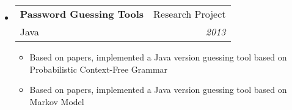 \documentclass[letterpaper,10pt]{article}
\makeatletter
\newcommand{\resitem}[1]{\item #1 \vspace{-2pt}}
\newcommand{\resheading}[1]{{\large \colorbox{mygrey}{\begin{minipage}{\textwidth}{\textbf{#1 \vphantom{p\^{E}}}}\end{minipage}}}}
\newcommand{\ressubheading}[4]{
\begin{tabular*}{6.5in}{l@{\extracolsep{\fill}}r}
		\textbf{#1} & #2 \\
		#3 & #4 \\
\end{tabular*}\vspace{-6pt}}
\makeatother
\begin{document}
	\begin{itemize}
		\item
			\ressubheading{Password Guessing Tools}{Research Project}{Java}{\emph{2013}}
			{\begin{itemize}
				\resitem{Based on papers, implemented a Java version guessing tool based on Probabilistic Context-Free Grammar}
                \resitem{Based on papers, implemented a Java version guessing tool based on Markov Model}
			\end{itemize}
			}	
	\end{itemize}





\end{document}
